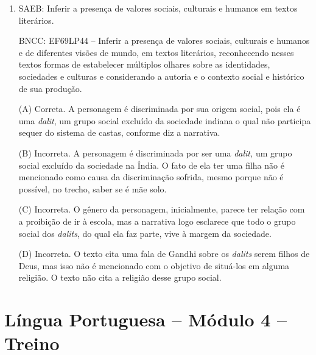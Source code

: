 \begin{enumerate}
(D) Incorreta. O poema descreve as sensações de um momento específico, e
não a busca da felicidade ou sua fugacidade, como seria no caso de compará-la a uma borboleta.

\item
SAEB: Inferir a presença de valores sociais, culturais e humanos em
textos literários. 

BNCC: EF69LP44 -- Inferir a presença de valores
sociais, culturais e humanos e de diferentes visões de mundo, em textos
literários, reconhecendo nesses textos formas de estabelecer múltiplos
olhares sobre as identidades, sociedades e culturas e considerando a
autoria e o contexto social e histórico de sua produção.

(A) Correta. A personagem é discriminada por sua origem social, pois ela
é uma \emph{dalit}, um grupo social excluído da sociedade indiana o qual
não participa sequer do sistema de castas, conforme diz a narrativa.

(B) Incorreta. A personagem é discriminada por ser uma \emph{dalit,} um
grupo social excluído da sociedade na Índia. O fato de ela ter uma filha
não é mencionado como causa da discriminação sofrida, mesmo porque não é
possível, no trecho, saber se é mãe solo.

(C) Incorreta. O gênero da personagem, inicialmente, parece ter relação
com a proibição de ir à escola, mas a narrativa logo esclarece que todo
o grupo social dos \emph{dalits}, do qual ela faz parte, vive à margem
da sociedade.

(D) Incorreta. O texto cita uma fala de Gandhi sobre os \emph{dalits}
serem filhos de Deus, mas isso não é mencionado com o objetivo de
situá-los em alguma religião. O texto não cita a religião desse grupo
social.
\end{enumerate}

\section*{Língua Portuguesa – Módulo 4 – Treino}

